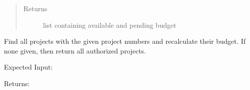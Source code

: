 \documentclass[letterpaper,10pt,english]{sphinxmanual}
\begin{document}
\begin{fulllineitems}
\begin{fulllineitems}
\begin{quote}
\begin{description}
\item[{Returns}] \leavevmode
list containing available and pending budget

\end{description}\end{quote}

\end{fulllineitems}


\begin{fulllineitems}
\label{\detokenize{apidoc/utdesign_procurement:utdesign_procurement.apigateway.ApiGateway.findProject}}
Find all projects with the given project numbers and recalculate
their budget. If none given, then return all authorized projects.

Expected Input:

\begin{sphinxVerbatim}[commandchars=\\\{\}]
        
\end{sphinxVerbatim}

Returns:


\end{fulllineitems}
\end{fulllineitems}
\end{document}
